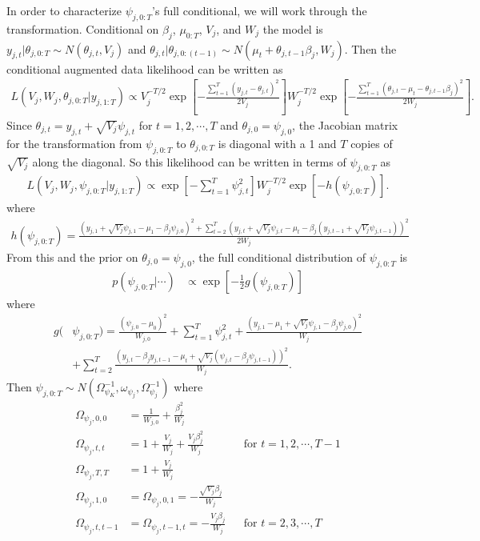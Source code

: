 \documentclass[graybox]{svmult}
\begin{document}
In order to characterize $\psi_{j,0:T}$'s full conditional, we will work through the transformation. Conditional on $\beta_j$, $\mu_{0:T}$, $V_j$, and $W_j$ the model is $y_{j,t}|\theta_{j,0:T}\sim N(\theta_{j,t},V_j)$ and $\theta_{j,t}|\theta_{j,0:(t-1)}\sim N(\mu_t + \theta_{j,t-1}\beta_j,W_j)$. Then the conditional augmented data likelihood can be written as
\begin{align*}
L(V_j,W_j,\theta_{j,0:T}|y_{j,1:T}) \propto V_j^{-T/2}\exp\left[-\frac{\sum_{t=1}^T(y_{j,t}-\theta_{j,t})^2}{2V_j}\right] W_j^{-T/2}\exp\left[-\frac{\sum_{t=1}^T(\theta_{j,t}-\mu_t-\theta_{j,t-1}\beta_j)^2}{2W_j}\right].
\end{align*}
Since $\theta_{j,t}=y_{j,t} + \sqrt{V_j}\psi_{j,t}$ for $t=1,2,\cdots,T$ and $\theta_{j,0}=\psi_{j,0}$, the Jacobian matrix for the transformation from $\psi_{j,0:T}$ to $\theta_{j,0:T}$ is diagonal with a 1 and $T$ copies of $\sqrt{V_j}$ along the diagonal. So this likelihood can be written in terms of $\psi_{j,0:T}$ as
\begin{align*}
L(V_j,W_j,\psi_{j,0:T}|y_{j,1:T}) \propto \exp\left[-\sum_{t=1}^T\psi_{j,t}^2\right] W_j^{-T/2}\exp\left[-h(\psi_{j,0:T})\right].
\end{align*}
where
\begin{align*}
h(\psi_{j,0:T}) = \frac{(y_{j,1} + \sqrt{V_j}\psi_{j,1} - \mu_1 - \beta_j\psi_{j,0})^2 +  \sum_{t=2}^T(y_{j,t} + \sqrt{V_j}\psi_{j,t}-\mu_t-\beta_j(y_{j,t-1} + \sqrt{V_j}\psi_{j,t-1}))^2}{2W_j}
\end{align*}
From this and the prior on $\theta_{j,0}=\psi_{j,0}$, the full conditional distribution of $\psi_{j,0:T}$ is
\begin{align*}
p(\psi_{j,0:T}|\cdots)&\propto \exp\left[-\frac{1}{2}g(\psi_{j,0:T})\right]
\end{align*}
where
\begin{align*}
g(&\psi_{j,0:T}) = \frac{(\psi_{j,0} - \mu_0)^2}{W_{j,0}} + \sum_{t=1}^T\psi_{j,t}^2 + \frac{(y_{j,1} - \mu_1 + \sqrt{V_j}\psi_{j,1} - \beta_j\psi_{j,0})^2}{W_j}\\  
&+ \sum_{t=2}^T\frac{(y_{j,t} - \beta_jy_{j,t-1} - \mu_t + \sqrt{V_j}(\psi_{j,t} - \beta_j\psi_{j,t-1}))^2}{W_j}.
\end{align*}
Then $\psi_{j,0:T}\sim N(\Omega_{\psi_K}^{-1},\omega_{\psi_j},\Omega_{\psi_j}^{-1})$ where
\begin{align*}
\Omega_{\psi_j,0,0}&=\frac{1}{W_{j,0}} + \frac{\beta_j^2}{W_j}&&\\
\Omega_{\psi_j,t,t}&=1 + \frac{V_j}{W_j} + \frac{V_j\beta_j^2}{W_j}&&\mbox{for } t=1,2,\cdots,T-1\\
\Omega_{\psi_j,T,T}&=1 + \frac{V_j}{W_j}&&\\
\Omega_{\psi_j,1,0}&=\Omega_{\psi_j,0,1}=-\frac{\sqrt{V_j}\beta_j}{W_j}&&\\
\Omega_{\psi_j,t,t-1}&=\Omega_{\psi_j,t-1,t}=-\frac{V_j\beta_j}{W_j}&&\mbox{for } t=2,3,\cdots,T
\end{align*}
\end{document}
